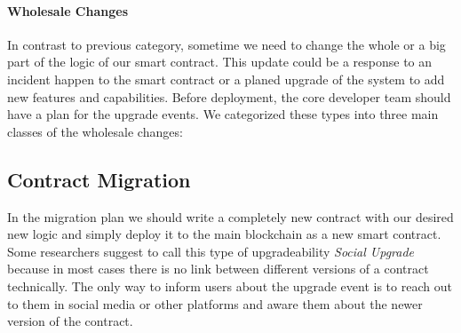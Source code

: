 





\paragraph{Wholesale Changes}
In contrast to previous category, sometime we need to change the whole or a big part of the logic of our smart contract. This update could be a response to an incident happen to the smart contract or a planed upgrade of the system to add new features and capabilities. Before deployment, the core developer team should have a plan for the upgrade events. We categorized these types into three main classes of the wholesale changes:


\subsection{Contract Migration}
In the migration plan we should write a completely new contract with our desired new logic and simply deploy it to the main blockchain as a new smart contract. Some researchers suggest to call this type of upgradeability \textit{Social Upgrade}~\cite{socialUpgrade} because in most cases there is no link between different versions of a contract technically. The only way to inform users about the upgrade event is to reach out to them in social media or other platforms and aware them about the newer version of the contract.

